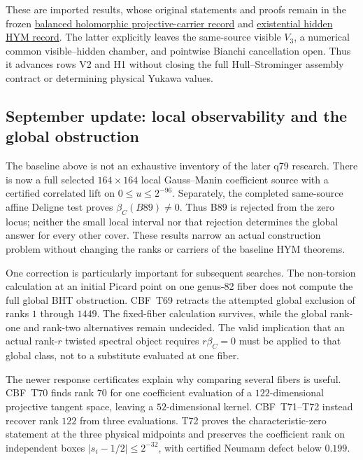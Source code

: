 \documentclass[11pt]{article}
\theoremstyle{definition}
\theoremstyle{remark}
\begin{document}
These are imported results, whose original statements and proofs remain
in the frozen
\href{https://github.com/PeterNero/mtt-results-repro/blob/f141a20ea23c5c3ff19cc2161c0e226e29ade8a7/release/results/unified_source_balanced_holomorphic_p39/artifact.json}{balanced holomorphic projective-carrier record}
and
\href{https://github.com/PeterNero/mtt-results-repro/blob/f141a20ea23c5c3ff19cc2161c0e226e29ade8a7/release/results/unified_source_hidden_projective_hym/artifact.json}{existential hidden HYM record}.
The latter explicitly leaves the same-source visible $V_3$, a numerical
common visible--hidden chamber, and pointwise Bianchi cancellation open.
Thus it advances rows V2 and H1 without closing the full
Hull--Strominger assembly contract or determining physical Yukawa values.

\subsection{September update: local observability and the global obstruction}

The baseline above is not an exhaustive inventory of the later q79 research.
There is now a full selected $164\times164$ local Gauss--Manin coefficient
source with a certified correlated lift on $0\leq u\leq2^{-96}$.
Separately, the completed same-source affine Deligne test proves
$\beta_C(B89)\neq0$. Thus B89 is rejected from the zero locus; neither the
small local interval nor that rejection determines the global answer for
every other cover. These results narrow an actual construction problem
without changing the ranks or carriers of the baseline HYM theorems.

One correction is particularly important for subsequent searches.
The non-torsion calculation at an initial Picard point on one genus-82
fiber does not compute the full global BHT obstruction. CBF~T69 retracts
the attempted global exclusion of ranks $1$ through $1449$.
The fixed-fiber calculation survives, while the global rank-one and
rank-two alternatives remain undecided. The valid implication that an
actual rank-$r$ twisted spectral object requires $r\beta_C=0$ must be
applied to that global class, not to a substitute evaluated at one fiber.

The newer response certificates explain why comparing several fibers is
useful. CBF~T70 finds rank $70$ for one coefficient evaluation of a
$122$-dimensional projective tangent space, leaving a $52$-dimensional
kernel. CBF~T71--T72 instead recover rank $122$ from three evaluations.
T72 proves the characteristic-zero statement at the three physical
midpoints and preserves the coefficient rank on independent boxes
$|s_i-1/2|\leq2^{-32}$, with certified Neumann defect below $0.199$.
\end{document}
